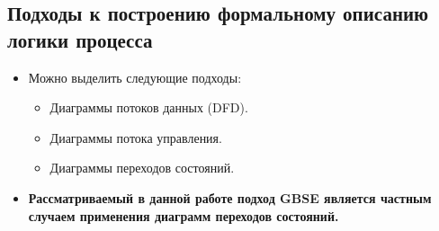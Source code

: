 \subsection{Подходы к построению формальному описанию логики процесса}
\begin{frame}
  \begin{itemize}
    \item Можно выделить следующие подходы:
          \begin{itemize}
            \item Диаграммы потоков данных (DFD).
            \item Диаграммы потока управления.
            \item Диаграммы переходов состояний.
          \end{itemize}

    \item \textbf{Рассматриваемый в данной работе подход GBSE является частным случаем применения диаграмм переходов состояний.}
  \end{itemize}

\end{frame}



